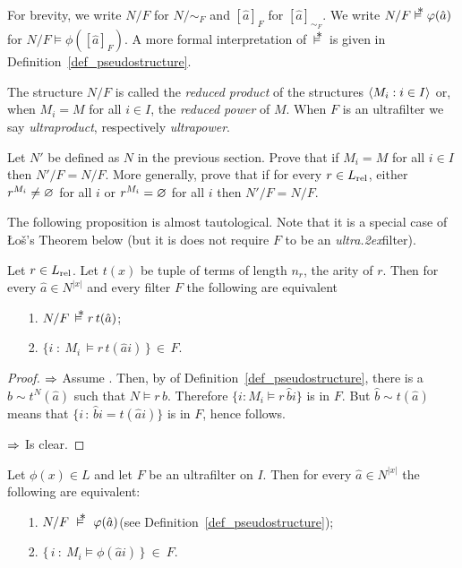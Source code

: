 \documentclass[creche.tex]{subfiles}
\begin{document}
For brevity, we write $N/F$ for $N/{\sim}_F$ and $[\hat a]_F$ for $[\hat a]_{\sim_F}$.
We write $N/F\pmodels\phi(\hat a)$ for $N/F\models\phi([\hat a]_F)$.
A more formal interpretation of $\,\pmodels\,$ is given in Definition~\ref{def_pseudostructure}.


The structure $N/F$ is called the \emph{reduced product\/} of the structures $\langle M_i:i\in I\rangle$ or, when $M_i=M$ for all $i\in I$, the \emph{reduced power\/} of $M$. When $F$ is an ultrafilter we say \emph{ultraproduct}, respectively \emph{ultrapower}.

\begin{exercise}
  Let $N'$ be defined as $N$ in the previous section.
  Prove that if $M_i=M$ for all $i\in I$ then $N'/F=N/F$. 
  More generally, prove that if for every $r\in L_{\rm rel}$, either $r^{M_i}\neq\varnothing$ for all $i$ or $r^{M_i}=\varnothing$ for all $i$ then $N'/F=N/F$.\QED
\end{exercise}

The following proposition is almost tautological.
Note that it is a special case of \L o\v{s}'s Theorem below (but it is does not require $F$ to be an \textit{ultra\kern.2ex}filter).

\begin{proposition}\label{prop_eq_ultra}
  Let $r\in L_{\rm rel}$.
  Let $t(x)$ be tuple of terms of length $n_r$, the arity of $r$.
  Then for every $\hat a\in N^{|x|}$ and every filter $F$ the following are equivalent
  \begin{itemize}
  \item[1.] $N/F\,\pmodels r\,t(\hat a)$;

  \item[2.] $\big\{i\; :\ M_i\,\models r\,t(\hat ai)\,\big\}\,\in\, F$.
  \end{itemize}
\end{proposition}

\begin{proof}
  $\Rightarrow$ 
  Assume .
  Then, by  of Definition~\ref{def_pseudostructure}, there is a $\hat b\sim t^N(\hat a)$ such that $N\models r\,\hat b$.
  Therefore $\{i:M_i\models r\,\hat bi\}$ is in $F$.
  But $\hat b\sim t(\hat a)$ means that $\big\{i\, :\, \hat bi= t(\hat ai)\big\}$ is in $F$, hence  follows.

  $\Rightarrow$ Is clear.
\end{proof}

\begin{void_thm}[\L o\'{s}'s Theorem]\label{thm_los}
Let $\phi(x)\in L$ and let $F$ be an ultrafilter on $I$. Then for every $\hat a\in N^{|x|}$ the following are equivalent:
\begin{itemize}
\item[1.] $N/F\ \pmodels\ \phi(\hat a)$\hfill (see  Definition~\ref{def_pseudostructure});
\item[2.] $\big\{\,i\ :\ M_i\models \phi(\hat a i)\,\big\}\ \in\ F$.
\end{itemize}
\end{void_thm}
\end{document}
